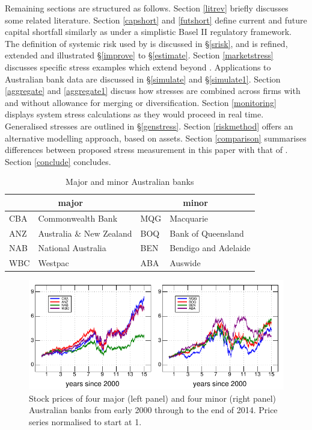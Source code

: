 \documentclass[12pt]{article}
\newcommand{\sref}[1]{\S\ref{#1}}
\begin{document}
Remaining sections are structured as follows. Section \ref{litrev} briefly discusses some related literature. Section \ref{capshort} and \ref{futshort} define current and future  capital shortfall similarly as \cite{brownlees2015} under a simplistic Basel II regulatory framework. The definition of systemic risk used by \cite{brownlees2015} is discussed in \sref{srisk}, and is refined, extended and illustrated \sref{improve} to \sref{estimate}. Section \ref{marketstress} discusses specific stress examples which extend beyond \cite{brownlees2015}. Applications to Australian bank data are discussed in \sref{simulate} and \sref{simulate1}. Section \ref{aggregate} and \ref{aggregate1} discuss how stresses are combined across firms with and without allowance for merging or diversification. Section \ref{monitoring} displays system stress calculations as they would proceed in real time. Generalised stresses are outlined in \sref{genstress}.  Section \ref{riskmethod} offers an alternative modelling approach, based on assets. Section \ref{comparison} summarises differences between proposed stress measurement in this paper with that of 
\cite{brownlees2015}. Section \ref{conclude} concludes.

\begin{table}[htbp]
\label{banks}\caption{Major and minor Australian banks}\label{eightbanks}
\begin{center}
\begin{tabular}{l|l||l|l}
\hline
 \multicolumn{2}{c||}{major}& \multicolumn{2}{c}{minor}\\
 \hline
CBA & Commonwealth Bank  & MQG & Macquarie \\
ANZ & Australia \& New Zealand  & BOQ & Bank of Queensland\\
NAB & National Australia  & BEN & Bendigo and Adelaide \\
WBC & Westpac & ABA& Auswide \\
\hline
\end{tabular}
\end{center}
\end{table}%


\begin{figure}[htbp]
\begin{center}
\includegraphics{figures/prices.pdf}
\caption{Stock  prices of four major (left panel) and four minor (right panel) Australian banks from early 2000 through to the end of 2014.  Price series normalised to start at 1.}
\label{prices}
\end{center}
\end{figure}
\end{document}
